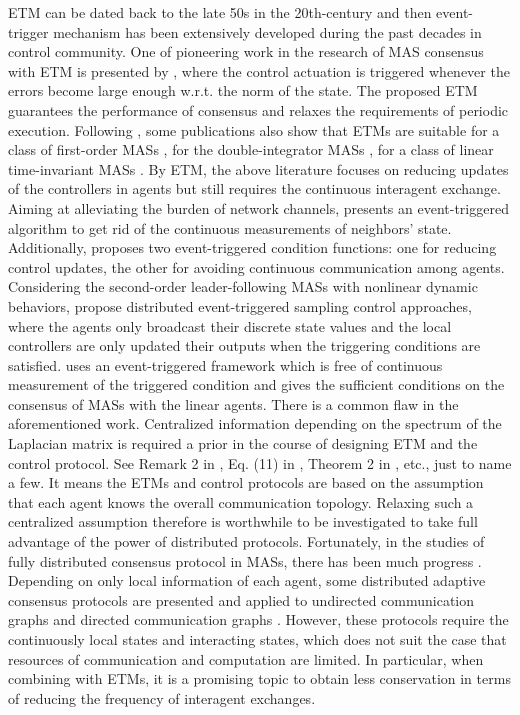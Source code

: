 \documentclass[review]{elsarticle}
\begin{document}
ETM can be dated back to the late 50s in the 20th-century \cite{Ellis1959Extension} and then event-trigger mechanism has been extensively developed during the past decades in control community. One of pioneering work in the research of MAS consensus with ETM is presented by \cite{Tabuada2007Event}, where the control actuation is triggered whenever the errors become large enough w.r.t. the norm of the state. The proposed ETM guarantees the performance of consensus and relaxes the requirements of periodic execution. 
Following \cite{Tabuada2007Event}, some publications also show that ETMs are suitable for a class of first-order MASs \cite{Dimarogonas2012Distributed}, for the double-integrator MASs \cite{Seyboth2013Event}, for a class of linear time-invariant MASs \cite{Guinaldo2012Distributed}.
By ETM, the above literature focuses on reducing updates of the controllers in agents but still requires the continuous interagent exchange. Aiming at alleviating the burden of network channels, \cite{Fan2013Technical} presents an event-triggered algorithm to get rid of the continuous measurements of neighbors' state. Additionally, \cite{Zhu2014Event}  proposes two event-triggered condition functions: one for reducing control updates, the other for avoiding continuous communication among agents. Considering the second-order leader-following MASs with nonlinear dynamic behaviors,   \cite{Li2015Event,Zhao2017Event} propose distributed event-triggered sampling control approaches, where the agents only broadcast their discrete state values and the local controllers are only updated their outputs when the triggering conditions are satisfied.   
\cite{Guo2014A} uses an event-triggered framework which is free of continuous measurement of the triggered condition and gives the sufficient conditions on the consensus of MASs with the linear agents. 
There is a common flaw in the aforementioned work. Centralized information depending on the spectrum of the Laplacian matrix is required a prior in the course of designing ETM and the control protocol. See Remark 2 in \cite{Zhu2014Event}, Eq. (11) in \cite{Zhao2017Event}, Theorem 2 in \cite{Guo2014A}, etc., just to name a few.
It means the ETMs and control protocols are based on the assumption that each agent knows the overall communication topology. Relaxing such a centralized assumption therefore is worthwhile to be investigated to take full advantage of the power of distributed protocols. 
Fortunately, in the studies of fully distributed consensus protocol in MASs, there has been much progress \cite{Yu2011Distributed,Zhongkui2013Distributed,Zhongkui2015Designing, yan2019event,Yuezu2017}. Depending on only local information of each agent, some distributed adaptive consensus protocols are presented and applied to undirected communication graphs \cite{Yu2011Distributed,Zhongkui2013Distributed, goebel2020unifying} and directed communication graphs \cite{Zhongkui2015Designing, Yuezu2017, fu2019robust}. However, these protocols require the continuously local states and interacting states, which does not suit the case that resources of communication and computation are limited. In particular, when combining with ETMs, it is a promising topic to obtain less conservation in terms of reducing the frequency of interagent exchanges.
\end{document}
